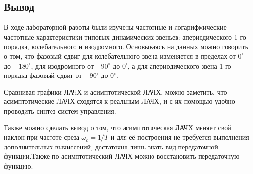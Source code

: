 \documentclass[a4paper,12pt]{article} %
\begin{document}
\newpage
\begin{center}
	\section*{Вывод}
\end{center}
\par
В ходе лабораторной работы были изучены частотные и логарифмические частотные характеристики типовых динамических звеньев: апериодического 1-го порядка, колебательного и изодромного.
Основываясь на данных можно говорить о том, что фазовый сдвиг для колебательного звена изменяется в пределах от $0^{\circ}$ до $-180^{\circ}$, для изодромного от $-90^{\circ}$ до $0^{\circ}$, а для апериодического звена 1-го порядка фазовый сдвиг от $-90^{\circ}$ до $0^{\circ}$.\par
Сравнивая графики ЛАЧХ и асимптотической ЛАЧХ, можно заметить, что асимптотические ЛАЧХ сходятся к реальным ЛАЧХ, и с их помощью удобно проводить синтез систем управления.\par
Также можно сделать вывод о том, что асимптотическая ЛАЧХ меняет свой наклон при частоте среза $\omega_c = 1/T$ и для её построения не требуется выполнения дополнительных вычислений, достаточно лишь знать вид передаточной функции.Также по асимптотический ЛАЧХ можно восстановить передаточную функцию.  
\end{document}
